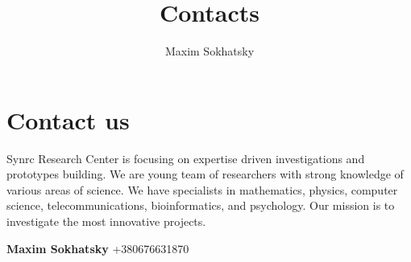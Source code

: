 \documentclass[11pt]{article}
\begin{document}

\title{Contacts}
\author{Maxim Sokhatsky}


\section*{Contact us}

Synrc Research Center is focusing on expertise driven
investigations and prototypes building. We are young
team of researchers with strong knowledge of various
areas of science. We have specialists in mathematics,
physics, computer science, telecommunications,
bioinformatics, and psychology. Our mission is to investigate the most innovative
projects.

\textbf{Maxim Sokhatsky}  +380676631870
\end{document}
